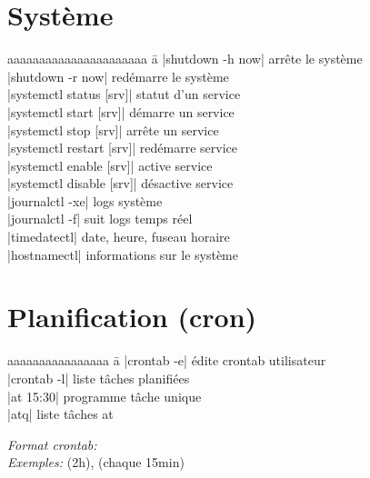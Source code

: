 \documentclass{article}
\begin{document}
\begin{multicols}{4}
    \section*{Système}

    \begin{tabbing}
        aaaaaaaaaaaaaaaaaaaaaa \= a \kill
        \code|shutdown -h now| \> arrête le système \\
        \code|shutdown -r now| \> redémarre le système \\
        \code|systemctl status [srv]| \> statut d'un service \\
        \code|systemctl start [srv]| \> démarre un service \\
        \code|systemctl stop [srv]| \> arrête un service \\
        \code|systemctl restart [srv]| \> redémarre service \\
        \code|systemctl enable [srv]| \> active service \\
        \code|systemctl disable [srv]| \> désactive service \\
        \code|journalctl -xe| \> logs système \\
        \code|journalctl -f| \> suit logs temps réel \\
        \code|timedatectl| \quad date, heure, fuseau horaire \\
        \code|hostnamectl| \quad informations sur le système
    \end{tabbing}

    \section*{Planification (cron)}
    \begin{tabbing}
        aaaaaaaaaaaaaaaa \= a \kill
        \code|crontab -e| \> édite crontab utilisateur \\
        \code|crontab -l| \> liste tâches planifiées \\
        \code|at 15:30| \> programme tâche unique \\
        \code|atq| \> liste tâches at
    \end{tabbing}

    \emph{Format crontab:}  \\
    \emph{Exemples:}  (2h),  (chaque 15min)


\end{multicols}
\end{document}
